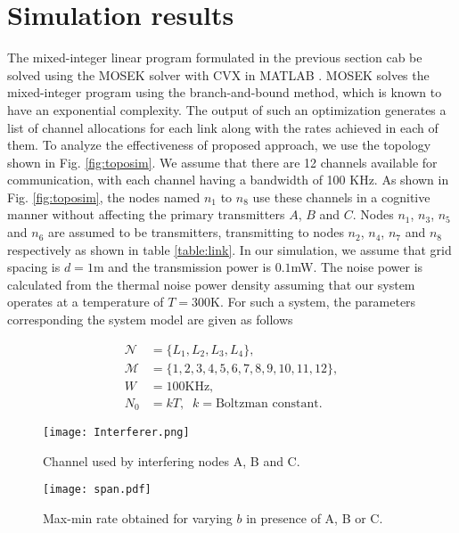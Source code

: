 \documentclass[conference]{IEEEtran}
\begin{document}
\section{Simulation results}
\label{sec:sim}
The mixed-integer linear program formulated in the previous section cab be solved using the MOSEK solver with CVX in MATLAB \cite{cvx, mosek}.  MOSEK solves the mixed-integer program using the branch-and-bound method, which is known to have an exponential complexity. The output of such an optimization generates a list of channel allocations for each link along with the rates achieved in each of them.
To analyze the effectiveness of proposed approach, we use the  topology shown in Fig. \ref{fig:toposim}. We assume that there are 12  channels  available for communication, with each channel having a bandwidth of  100 KHz. As shown in  Fig. \ref{fig:toposim}, the nodes named $n_1$ to $n_8$ use these channels in a cognitive manner without affecting the primary transmitters $A$, $B$ and $C$. Nodes $n_1$, $n_3$, $n_5$ and $n_6$ are assumed to be transmitters, transmitting to nodes $n_2$, $n_4$, $n_7$ and $n_8$ respectively as shown in table \ref{table:link}. In our simulation, we assume that grid spacing is $d=1$m and the transmission power is $0.1$mW. The noise power is calculated from the thermal noise power density assuming that our system operates at a temperature of $T=300$K. For such a system, the parameters corresponding the system model are given as follows

\begin{align}
  \mathcal{N} &= \{L_1,L_2,L_3,L_4\},\, \nonumber\\
  \mathcal{M} &= \{1,2,3,4,5,6,7,8,9,10,11,12\}, \nonumber\\
  W&=100\mbox{KHz}, \nonumber\\
  N_0&=kT, \;\; k=\mbox{Boltzman constant}.\nonumber
\end{align}


\begin{figure}[!t] 
  \centering
    \texttt{[image: Interferer.png]}
    \caption{Channel used by interfering nodes A, B and C.}
  \label{fig:interfer}
\end{figure}


\begin{figure}[!t]
  \centering
    \texttt{[image: span.pdf]}
    \caption{Max-min rate obtained for varying $b$ in presence of A, B or C.}
  \label{fig:span}
\end{figure}
\end{document}
